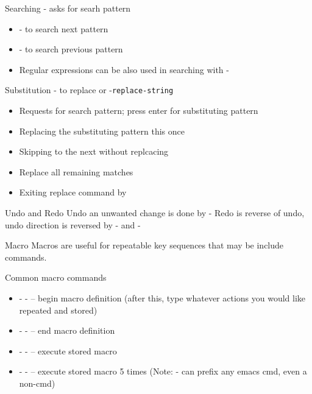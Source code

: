 \documentclass[newPxFont,sthlmFooter,nooffset]{beamer}
\begin{document}
\begin{frame}[t]{Searching}
- asks for searh pattern
\begin{itemize}
\item {}- to search next pattern
\item {}- to search previous pattern
\item Regular expressions can be also used in searching with - 
\end{itemize}

\end{frame}

\begin{frame}[t]{Substitution}
-\keystroke{$\%$} to replace or -\texttt{replace-string}
\begin{itemize}
\item Requests for search pattern; press enter for substituting pattern 
\item Replacing the substituting pattern this once 
\item Skipping to the next without replcacing 
\item Replace all remaining matches \keystroke{!}
\item Exiting replace command by 
\end{itemize}

\end{frame}


\begin{frame}[t]{Undo and Redo}
Undo an unwanted change is done by -\keystroke{\_}  
\bigskip
Redo is reverse of undo, undo direction is reversed by - and -\keystroke{\_}

\end{frame}


\begin{frame}[t]{Macro}
Macros are useful for repeatable key sequences that may be include commands.

\bigskip
Common macro commands
\begin{itemize}
\item {}- - \keystroke{(}– begin macro definition (after this, type whatever actions you would like repeated and stored)       
\item {}- - \keystroke{)}– end macro definition
\item {}- -  – execute stored macro
\item {}-  - – execute stored macro 5 times (Note: - can prefix any emacs cmd, even a non-cmd)
\end{itemize}
\end{frame}
\end{document}
